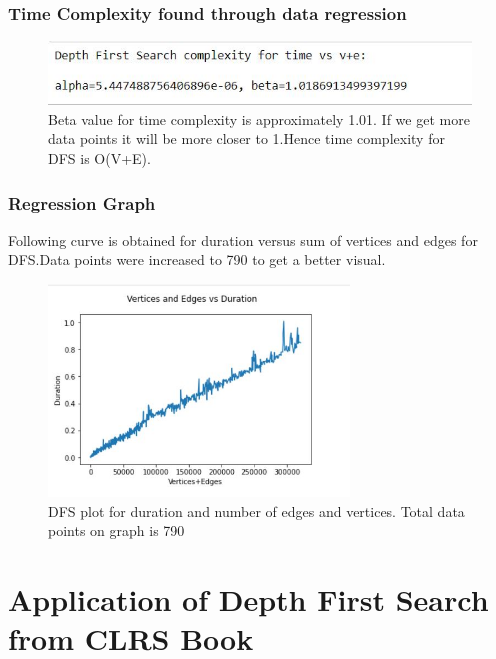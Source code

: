 \documentclass[12pt,runningheads]{article}
\begin{document}
\subsubsection{Time Complexity found through data regression}
\begin{figure}[htp]
    \centering
    \includegraphics[width=12cm]{dfscomplexity.JPG}
    \caption{Beta value for time complexity is approximately 1.01. If we get more data points it will be more closer to 1.Hence time complexity for DFS is O(V+E).}
    \label{fig:galaxy}
\end{figure}
\subsubsection{Regression Graph}
Following curve is obtained for duration versus sum of vertices and edges for DFS.Data points were increased to 790 to get a better visual.

\begin{figure}[htp]
    \centering
    \includegraphics[width=8cm]{dfsgraphline1.JPG}
    \caption{DFS plot for duration and number of edges and vertices. Total data points on graph is 790}
    \label{fig:galaxy}
\end{figure}
\section{Application of Depth First Search from CLRS Book}
\end{document}
